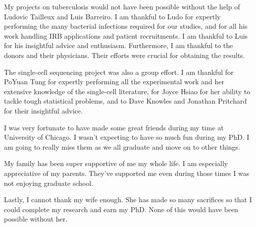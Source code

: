 My projects on tuberculosis would not have been possible without the
help of Ludovic Tailleux and Luis Barreiro. I am thankful to Ludo for
expertly performing the many bacterial infections required for our
studies, and for all his work handling IRB applications and patient
recruitments. I am thankful to Luis for his insightful advice and
enthusiasm. Furthermore, I am thankful to the donors and their
physicians. Their efforts were crucial for obtaining the results.

The single-cell sequencing project was also a group effort. I am
thankful for PoYuan Tung for expertly performing all the experimental
work and her extensive knowledge of the single-cell literature, for
Joyce Hsiao for her ability to tackle tough statistical problems, and
to Dave Knowles and Jonathan Pritchard for their insightful advice.

I was very fortunate to have made some great friends during my time at
University of Chicago. I wasn't expecting to have so much fun during
my PhD. I am going to really miss them as we all graduate and move on
to other things.

My family has been super supportive of me my whole life. I am
especially appreciative of my parents. They've supported me even
during those times I was not enjoying graduate school.

Lastly, I cannot thank my wife enough. She has made so many sacrifices
so that I could complete my research and earn my PhD. None of this
would have been possible without her.
